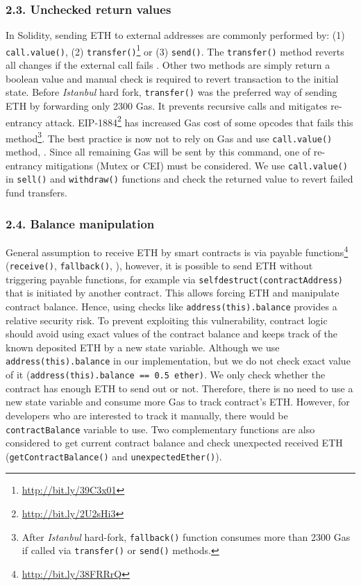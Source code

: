 \subsubsection*{2.3. Unchecked return values}
In Solidity, sending ETH to external addresses are commonly performed by: (1) \texttt{call.value()}, (2) \texttt{transfer()}\footnote{\url{http://bit.ly/39C3x01}} or (3) \texttt{send()}. The \texttt{transfer()} method reverts all changes if the external call fails \cite{SoliditySendEther}. Other two methods are simply return a boolean value and manual check is required to revert transaction to the initial state. Before \textit{Istanbul} hard fork\cite{IstanbulUpgrades}, \texttt{transfer()} was the preferred way of sending ETH by forwarding only 2300 Gas. It prevents recursive calls and mitigates re-entrancy attack. EIP-1884\footnote{\url{http://bit.ly/2U2sHi3}} has increased Gas cost of some opcodes that fails this method\footnote{After \textit{Istanbul} hard-fork, \texttt{fallback()} function consumes more than 2300 Gas if called via \texttt{transfer()} or \texttt{send()} methods.}. The best practice is now not to rely on Gas and use \texttt{call.value()} method\cite{ConsensysStopTran}, \cite{ChainSecurity}. Since all remaining Gas will be sent by this command, one of re-entrancy mitigations (\ie Mutex or CEI) must be considered. We use \texttt{call.value()} in \texttt{sell()} and \texttt{withdraw()} functions and check the returned value to revert failed fund transfers.

\subsubsection*{2.4. Balance manipulation}
General assumption to receive ETH by smart contracts is via payable functions\footnote{\url{http://bit.ly/38FRRrQ}} (\ie \texttt{receive()}, \texttt{fallback()}, \etc), however, it is possible to send ETH without triggering payable functions, for example via \texttt{selfdestruct(contractAddress)} that is initiated by another contract. This allows forcing ETH and manipulate contract balance\cite{UnexpectedEth}. Hence, using checks like \texttt{address(this).balance} provides a relative security risk. To prevent exploiting this vulnerability, contract logic should avoid using exact values of the contract balance and keeps track of the known deposited ETH by a new state variable. Although we use \texttt{address(this).balance} in our implementation, but we do not check exact value of it (\ie  \texttt{address(this).balance == 0.5 ether)}. We only check whether the contract has enough ETH to send out or not. Therefore, there is no need to use a new state variable and consume more Gas to track contract's ETH. However, for developers who are interested to track it manually, there would be \texttt{contractBalance} variable to use. Two complementary functions are also considered to get current contract balance and check unexpected received ETH (\ie \texttt{getContractBalance()} and \texttt{unexpectedEther()}).

